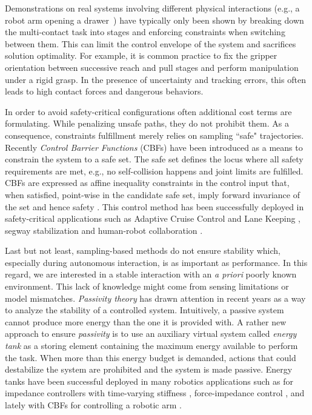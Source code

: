 Demonstrations on real systems involving different physical interactions (e.g., a robot arm opening a drawer~\cite{abraham_model-based_2020}) have typically only been shown by breaking down the multi-contact task into stages and enforcing constraints when switching between them. 
This can limit the control envelope of the system and sacrifices solution optimality. For example, it is common practice to fix the gripper orientation between successive reach and pull stages and perform manipulation under a rigid grasp. In the presence of uncertainty and tracking errors, this often leads to high contact forces and dangerous behaviors.

In order to avoid safety-critical configurations often additional cost terms are formulating. While penalizing unsafe paths, they do not prohibit them. As a consequence, constraints fulfillment merely relies on sampling ``safe" trajectories. 
Recently \emph{Control Barrier Functions} (CBFs) have been introduced as a means to constrain the system to a safe set. The safe set defines the locus where all safety requirements are met, e.g., no self-collision happens and joint limits are fulfilled. CBFs are expressed as affine inequality constraints in the control input that, when satisfied, point-wise in the candidate safe set, imply forward invariance of the set and hence safety \cite{ames2016control}.  This control method has been successfully deployed in safety-critical applications such as Adaptive Cruise Control and Lane Keeping \cite{vahidi2003research}, segway stabilization \cite{gurriet2018towards} and human-robot collaboration \cite{benzi2021optimization}.

Last but not least, sampling-based methods do not ensure stability which, especially during autonomous interaction, is as important as performance. In this regard, we are interested in a stable interaction with an \emph{a priori} poorly known environment. This lack of knowledge might come from sensing limitations or model mismatches. \emph{Passivity theory} has drawn attention in recent years as a way to analyze the stability of a controlled system. Intuitively, a passive system cannot produce more energy than the one it is provided with. A rather new approach to ensure \emph{passivity} is to use an auxiliary virtual system called \emph{energy tank} as a storing element containing the maximum energy available to perform the task. When more than this energy budget is demanded, actions that could destabilize the system are prohibited and the system is made passive. Energy tanks have been successful deployed in many robotics applications such as for impedance controllers with time-varying stiffness \cite{schindlbeck2015unified}, force-impedance control \cite{shahriari2018valve}, and lately with CBFs for controlling a robotic arm \cite{benzi2021optimization}.

